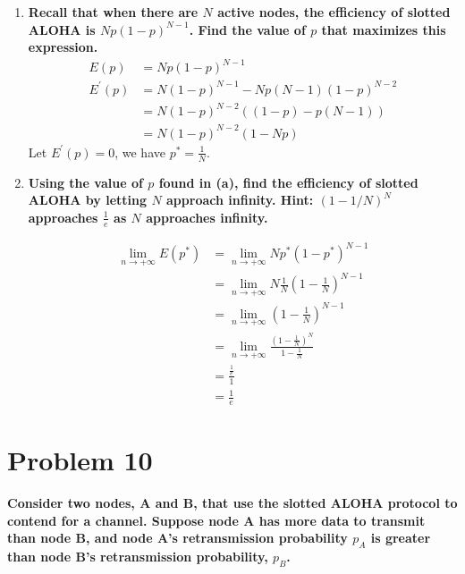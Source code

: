 \documentclass[11pt]{article}
\newenvironment{qparts}{\begin{enumerate}[{(}a{)}]}{\end{enumerate}}
\begin{document}
\begin{qparts}
	\item \textbf{Recall that when there are $N$ active nodes, the efficiency of slotted ALOHA is $Np(1 - p)^{N-1}$. Find the value of $p$ that maximizes this expression.}
	\begin{align*}
		E(p)
		&=
		Np(1 - p)^{N-1} \\
		E^\prime(p)
		&=
		N(1 - p)^{N-1} - Np(N-1)(1 - p)^{N-2} \\
		&=
		N(1 - p)^{N-2}((1-p) - p(N-1)) \\
		&=
		N(1 - p)^{N-2}(1-Np)
	\end{align*}
	Let $E^\prime(p) = 0$, we have $p^* = \frac{1}{N}$.
	\item \textbf{Using the value of $p$ found in (a), find the efficiency of slotted ALOHA by letting $N$ approach infinity. Hint: $(1 - 1/N)^N$ approaches $\frac{1}{e}$ as $N$ approaches infinity.}

	\begin{align*}
		\lim_{n \to +\infty} E(p^*)
		&=
		\lim_{n \to +\infty} Np^*(1 - p^*)^{N-1} \\
		&=
		\lim_{n \to +\infty} N\frac{1}{N}(1 - \frac{1}{N})^{N-1} \\
		&=
		\lim_{n \to +\infty} (1 - \frac{1}{N})^{N-1} \\
		&=
		\lim_{n \to +\infty} \frac{(1 - \frac{1}{N})^{N}}{1 - \frac{1}{N}} \\
		&=
		\frac{\frac{1}{e}}{1} \\
		&= 
		\frac{1}{e}
	\end{align*}	
\end{qparts}



\newpage
\section{Problem 10}

\textbf{Consider two nodes, A and B, that use the slotted ALOHA protocol to contend for a channel. Suppose node A has more data to transmit than node B, and node A's retransmission probability $p_A$ is greater than node B's retransmission probability, $p_B$.}
\end{document}
